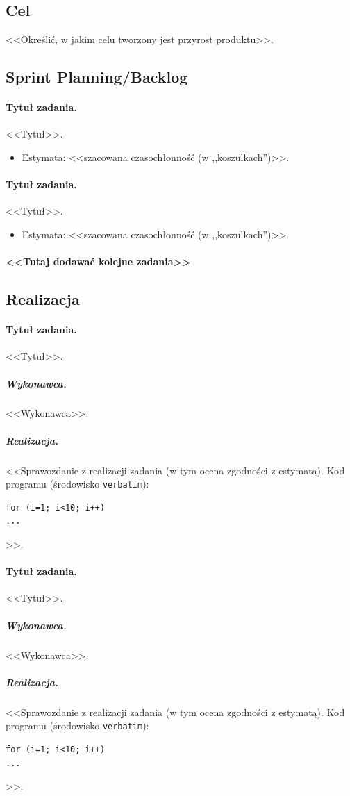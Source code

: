 \documentclass[a4paper]{article}
\begin{document}
\subsection{Cel} <<Określić, w jakim celu tworzony jest przyrost produktu>>.

\subsection{Sprint Planning/Backlog}

\paragraph{Tytuł zadania.} <<Tytuł>>.
\begin{itemize}
	\item Estymata: <<szacowana czasochłonność (w ,,koszulkach'')>>.
\end{itemize}

\paragraph{Tytuł zadania.} <<Tytuł>>.
\begin{itemize}
	\item Estymata: <<szacowana czasochłonność (w ,,koszulkach'')>>.
\end{itemize}

\paragraph{<<Tutaj dodawać kolejne zadania>>}

\subsection{Realizacja}

\paragraph{Tytuł zadania.} <<Tytuł>>.
\subparagraph{Wykonawca.} <<Wykonawca>>.
\subparagraph{Realizacja.} <<Sprawozdanie z realizacji zadania (w tym ocena zgodności z estymatą). Kod programu (środowisko \texttt{verbatim}): \begin{verbatim}
for (i=1; i<10; i++)
...
\end{verbatim}>>.

\paragraph{Tytuł zadania.} <<Tytuł>>.
\subparagraph{Wykonawca.} <<Wykonawca>>.
\subparagraph{Realizacja.} <<Sprawozdanie z realizacji zadania (w tym ocena zgodności z estymatą). Kod programu (środowisko \texttt{verbatim}): \begin{verbatim}
for (i=1; i<10; i++)
...
\end{verbatim}>>.
\end{document}

